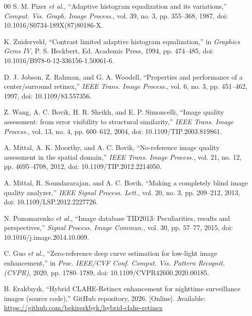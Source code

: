 \documentclass[conference,a4paper]{IEEEtran}
\begin{document}
\begin{thebibliography}{00}
 S. M. Pizer \emph{et al.}, ``Adaptive histogram
equalization and its variations,'' \emph{Comput. Vis. Graph. Image Process.},
vol. 39, no. 3, pp. 355--368, 1987, doi: 10.1016/S0734-189X(87)80186-X.

 K. Zuiderveld, ``Contrast limited adaptive
histogram equalization,'' in \emph{Graphics Gems IV}, P. S. Heckbert, Ed.
Academic Press, 1994, pp. 474--485, doi: 10.1016/B978-0-12-336156-1.50061-6.

 D. J. Jobson, Z. Rahman, and G. A. Woodell,
``Properties and performance of a center/surround retinex,'' \emph{IEEE Trans.
Image Process.}, vol. 6, no. 3, pp. 451--462, 1997, doi: 10.1109/83.557356.

 Z. Wang, A. C. Bovik, H. R. Sheikh, and E. P.
Simoncelli, ``Image quality assessment: from error visibility to structural
similarity,'' \emph{IEEE Trans. Image Process.}, vol. 13, no. 4, pp. 600--612,
2004, doi: 10.1109/TIP.2003.819861.

 A. Mittal, A. K. Moorthy, and A. C. Bovik,
``No-reference image quality assessment in the spatial domain,'' \emph{IEEE
Trans. Image Process.}, vol. 21, no. 12, pp. 4695--4708, 2012, doi:
10.1109/TIP.2012.2214050.

 A. Mittal, R. Soundararajan, and A. C. Bovik,
``Making a completely blind image quality analyzer,'' \emph{IEEE Signal
Process. Lett.}, vol. 20, no. 3, pp. 209--212, 2013, doi:
10.1109/LSP.2012.2227726.

 N. Ponomarenko \emph{et al.}, ``Image database
TID2013: Peculiarities, results and perspectives,'' \emph{Signal Process. Image
Commun.}, vol. 30, pp. 57--77, 2015, doi: 10.1016/j.image.2014.10.009.

 C. Guo \emph{et al.}, ``Zero-reference deep curve
estimation for low-light image enhancement,'' in \emph{Proc. IEEE/CVF Conf.
Comput. Vis. Pattern Recognit. (CVPR)}, 2020, pp. 1780--1789, doi:
10.1109/CVPR42600.2020.00185.

 B. Erakb{\i}y{\i}k, ``Hybrid CLAHE-Retinex
enhancement for nighttime surveillance images (source code),'' GitHub
repository, 2026. [Online]. Available:
\url{https://github.com/bekirerkbyk/hybrid-clahe-retinex}
\end{thebibliography}
\end{document}
